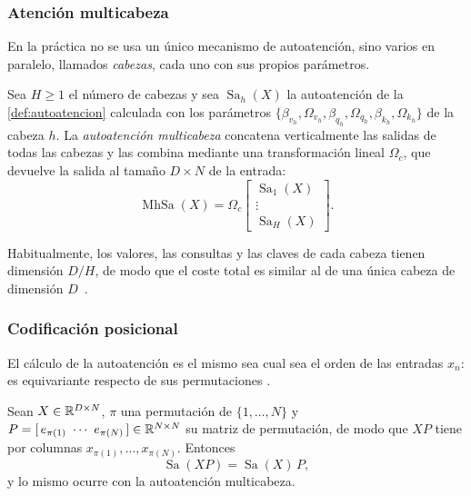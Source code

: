 \subsubsection{Atención multicabeza}

En la práctica no se usa un único mecanismo de autoatención, sino varios en paralelo, llamados \emph{cabezas}, cada uno con sus propios parámetros.

\begin{definicion}\label{def:multicabeza}
Sea $H\ge 1$ el número de cabezas y sea $\operatorname{Sa}_h(X)$ la autoatención de
la \cref{def:autoatencion} calculada con los parámetros
$\{\beta_{v_h},\Omega_{v_h},\beta_{q_h},\Omega_{q_h},\beta_{k_h},\Omega_{k_h}\}$
de la cabeza $h$. La \emph{autoatención multicabeza} concatena verticalmente las
salidas de todas las cabezas y las combina mediante una transformación lineal
$\Omega_c$, que devuelve la salida al tamaño $D\times N$ de la entrada:
\[
  \operatorname{MhSa}(X) = \Omega_c
  \begin{bmatrix}
    \operatorname{Sa}_1(X)\\
    \vdots\\
    \operatorname{Sa}_H(X)
  \end{bmatrix}.
\]
\end{definicion}

Habitualmente, los valores, las consultas y las claves de cada cabeza tienen dimensión $D/H$, de modo que el coste total es similar al de una única
cabeza de dimensión $D$~\cite[sec.~12.3.3]{prince2023understanding}.

\subsubsection{Codificación posicional}\label{sec:codificacion-posicional}

El cálculo de la autoatención es el mismo sea cual sea el orden de las entradas $x_n$: es equivariante respecto de sus permutaciones
\cite[sec.~12.3.1]{prince2023understanding}.

\begin{proposicion}\label{prop:sa-permutaciones}
Sean $X\in\mathbb{R}^{D\times N}$, $\pi$ una permutación de $\{1,\dots,N\}$ y
$P = [\,e_{\pi(1)}\ \cdots\ e_{\pi(N)}\,]\in\R^{N\times N}$ su matriz de
permutación, de modo que $XP$ tiene por columnas $x_{\pi(1)},\dots,x_{\pi(N)}$.
Entonces
\[
  \operatorname{Sa}(XP) = \operatorname{Sa}(X)\,P,
\]
y lo mismo ocurre con la autoatención multicabeza.
\end{proposicion}

